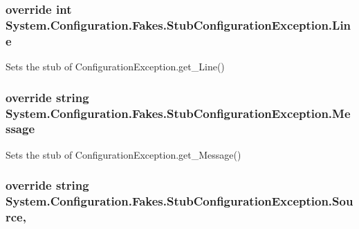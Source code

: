 \hypertarget{class_system_1_1_configuration_1_1_fakes_1_1_stub_configuration_exception_a54981c421cb5750c972655b3bfdf6926}{
\subsubsection[{Line}]{\setlength{\rightskip}{0pt plus 5cm}override int System.\-Configuration.\-Fakes.\-Stub\-Configuration\-Exception.\-Line\hspace{0.3cm}{\ttfamily [get]}}}\label{class_system_1_1_configuration_1_1_fakes_1_1_stub_configuration_exception_a54981c421cb5750c972655b3bfdf6926}


Sets the stub of Configuration\-Exception.\-get\-\_\-\-Line()

\hypertarget{class_system_1_1_configuration_1_1_fakes_1_1_stub_configuration_exception_aae1e2a25f7e79cf5a6b02b930840ca5e}{
\subsubsection[{Message}]{\setlength{\rightskip}{0pt plus 5cm}override string System.\-Configuration.\-Fakes.\-Stub\-Configuration\-Exception.\-Message\hspace{0.3cm}{\ttfamily [get]}}}\label{class_system_1_1_configuration_1_1_fakes_1_1_stub_configuration_exception_aae1e2a25f7e79cf5a6b02b930840ca5e}


Sets the stub of Configuration\-Exception.\-get\-\_\-\-Message()

\hypertarget{class_system_1_1_configuration_1_1_fakes_1_1_stub_configuration_exception_aca3d15e4fdd72086ae3084501c579fff}{
\subsubsection[{Source}]{\setlength{\rightskip}{0pt plus 5cm}override string System.\-Configuration.\-Fakes.\-Stub\-Configuration\-Exception.\-Source\hspace{0.3cm}{\ttfamily [get]}, {\ttfamily [set]}}}\label{class_system_1_1_configuration_1_1_fakes_1_1_stub_configuration_exception_aca3d15e4fdd72086ae3084501c579fff}



